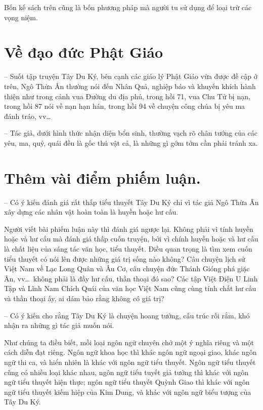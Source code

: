 Bốn kế sách trên cũng là bốn phương pháp mà người tu sử dụng để loại trừ các vọng niệm.

\section{Về đạo đức Phật Giáo} %
\label{sec:ve_dao_duc_Phat_Giao}

-- Suốt tập truyện Tây Du Ký, bên cạnh các giáo lý Phật Giáo vừa được đề cập ở trên, Ngô Thừa Ân thường nói đến Nhân Quả, nghiệp báo và khuyến khích hành thiện như trong cảnh vua Đường du địa phủ, trong hồi 71, vua Chu Tử bị nạn, trong hồi 87 nói về nạn hạn hán, trong hồi 94 về chuyện công chúa bị yêu ma đánh tráo, vv\ldots

-- Tác giả, dưới hình thức nhận diện bổn sinh, thường vạch rõ chân tướng của các yêu, ma, quỷ, quái đều là gốc thú vật cả, là những gì gớm tởm cần phải tránh xa.

\section{Thêm vài điểm phiếm luận.} %
\label{sec:them_vai_diem_phiem_luan}

-- Có ý kiến đánh giá rất thấp tiểu thuyết Tây Du Ký chỉ vì tác giả Ngô Thừa Ân xây dựng các nhân vật hoàn toàn là huyền hoặc hư cấu.

Người viết bài phiếm luận này thì đánh giá ngược lại. Không phải vì tính huyền hoặc và hư cấu mà đánh giá thấp cuốn truyện, bởi vì chính huyền hoặc và hư cấu là chất liệu của sáng tác văn học, tiểu thuyết. Điều quan trọng là tìm xem cuốn tiểu thuyết có nói lên được những giá trị sống nào không? Câu chuyện lịch sử Việt Nam về Lạc Long Quân và Âu Cơ, câu chuyện đức Thánh Gióng phá giặc Ân, vv\ldots ~không phải là đầy hư cấu, thần thoại đó sao? Các tập Việt Điện U Linh Tập và Lĩnh Nam Chích Quái của văn học Việt Nam cũng cùng tính chất hư cấu và thần thoại ấy, ai dám bảo rằng không có giá trị?

-- Có ý kiến cho rằng Tây Du Ký là chuyện hoang tưởng, cấu trúc rối rắm, khó nhận ra những gì tác giả muốn nói.

Như chúng ta điều biết, mỗi loại ngôn ngữ chuyên chở một ý nghĩa riêng và một cách diễn đạt riêng. Ngôn ngữ khoa học thì khác ngôn ngữ ngoại giao, khác ngôn ngữ thi ca, và hiển nhiên là khác với ngôn ngữ tiểu thuyết. Ngôn ngữ tiểu thuyết cũng có nhiều loại khác nhau, ngôn ngữ tiểu tuyết giả tưởng thì khác với ngôn ngữ tiểu thuyết hiện thực; ngôn ngữ tiểu thuyết Quỳnh Giao thì khác với ngôn ngữ tiểu thuyết kiếm hiệp của Kim Dung, và khác với ngôn ngữ biểu tượng của Tây Du Ký.

